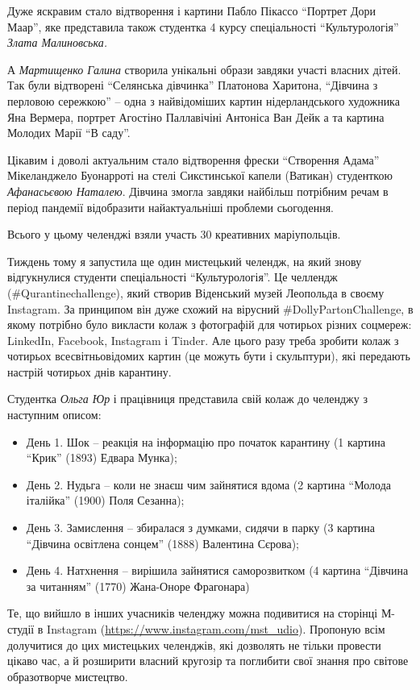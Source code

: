 
Дуже яскравим стало відтворення і картини Пабло Пікассо \enquote{Портрет Дори Маар},
яке представила також студентка 4 курсу спеціальності \enquote{Культурологія} \emph{Злата
Малиновська.}

А \emph{Мартищенко Галина} створила унікальні образи завдяки участі власних дітей. Так
були відтворені \enquote{Селянська дівчинка} Платонова Харитона, \enquote{Дівчина з перловою
сережкою} – одна з найвідоміших картин нідерландського художника Яна Вермера,
портрет Агостіно Паллавічіні Антоніса Ван Дейк а та картина Молодих Марії \enquote{В
саду}.


Цікавим і доволі актуальним стало відтворення фрески \enquote{Створення Адама}
Мікеланджело Буонарроті на стелі Сикстинської капели (Ватикан) студенткою
\emph{Афанасьєвою Наталею}. Дівчина змогла завдяки найбільш потрібним речам в
період пандемії відобразити найактуальніші проблеми сьогодення.

Всього у цьому челенджі взяли участь 30 креативних маріупольців.

Тиждень тому я запустила ще один мистецький челендж, на який знову відгукнулися
студенти спеціальності \enquote{Культурологія}. Це челлендж
(\#Qurantinechallenge), який створив Віденський музей Леопольда в своєму
Instagram. За принципом він дуже схожий на вірусний \#DollyPartonChallenge, в
якому потрібно було викласти колаж з фотографій для чотирьох різних соцмереж:
LinkedIn, Facebook, Instagram і Tinder. Але цього разу треба зробити колаж з
чотирьох всесвітньовідомих картин (це можуть бути і скульптури), які передають
настрій чотирьох днів карантину.

Студентка \emph{Ольга Юр} і працівниця представила свій колаж до челенджу з наступним
описом:

\begin{itemize} %
\item День 1. Шок – реакція на інформацію про початок карантину (1 картина
\enquote{Крик} (1893) Едвара Мунка);

\item День 2. Нудьга – коли не знаєш чим зайнятися вдома (2 картина \enquote{Молода італійка} (1900) Поля Сезанна);

\item День 3. Замислення – збиралася з думками, сидячи в парку (3 картина
\enquote{Дівчина освітлена сонцем} (1888) Валентина Сєрова);

\item День 4. Натхнення – вирішила зайнятися саморозвитком (4 картина
\enquote{Дівчина за читанням} (1770) Жана-Оноре Фрагонара)
\end{itemize} %

Те, що вийшло в інших учасників челенджу можна подивитися на сторінці М-студії
в Instagram (\url{https://www.instagram.com/mst_udio}). Пропоную всім
долучитися до цих мистецьких челенджів, які дозволять не тільки провести цікаво
час, а й розширити власний кругозір та поглибити свої знання про світове
образотворче мистецтво.
